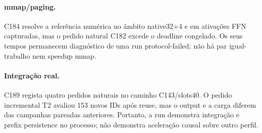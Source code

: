 \paragraph{mmap/paging.}
C184 resolve a referência numérica no âmbito native32+4 e em ativações FFN capturadas, mas o pedido natural C182 excede o deadline congelado. Os seus tempos permanecem diagnóstico de uma run protocol-failed; não há par igual-trabalho nem speedup mmap. 

\paragraph{Integração real.}
C189 regista quatro pedidos naturais no caminho C143/slots40. O pedido incremental T2 avaliou 153 novos IDs após reuse, mas o output e a carga diferem das campanhas pareadas anteriores. Portanto, a run demonstra integração e prefix persistence no processo; não demonstra aceleração causal sobre outro perfil. 
